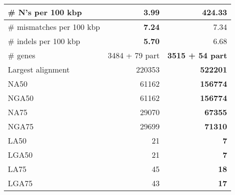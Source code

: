 \documentclass[12pt,a4paper]{article}
\begin{document}
\begin{table}[ht]
\begin{center}
\begin{tabular}{|l*{2}{|r}|}
\# N's per 100 kbp & {\bf 3.99} & 424.33 \\ \hline
\# mismatches per 100 kbp & {\bf 7.24} & 7.34 \\ \hline
\# indels per 100 kbp & {\bf 5.70} & 6.68 \\ \hline
\# genes & 3484 + 79 part & {\bf 3515 + 54 part} \\ \hline
Largest alignment & 220353 & {\bf 522201} \\ \hline
NA50 & 61162 & {\bf 156774} \\ \hline
NGA50 & 61162 & {\bf 156774} \\ \hline
NA75 & 29070 & {\bf 67355} \\ \hline
NGA75 & 29699 & {\bf 71310} \\ \hline
LA50 & 21 & {\bf 7} \\ \hline
LGA50 & 21 & {\bf 7} \\ \hline
LA75 & 45 & {\bf 18} \\ \hline
LGA75 & 43 & {\bf 17} \\ \hline
\end{tabular}
\end{center}
\end{table}
\end{document}

